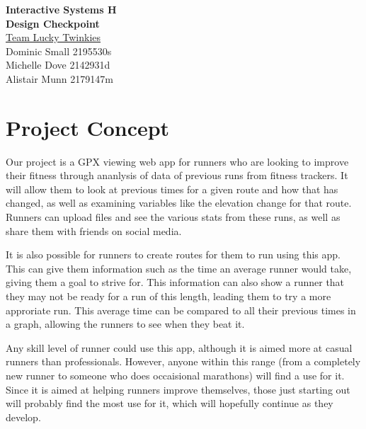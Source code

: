 \documentclass{article}
\begin{document}
\begin{center}
{\Huge \textbf{Interactive Systems H}}\\
{\huge \textbf{Design Checkpoint}}\\
\vspace{5mm}
\underline{Team Lucky Twinkies}\\
Dominic Small 2195530s\\
Michelle Dove 2142931d\\
Alistair Munn 2179147m\\
\end{center}

\section{Project Concept}
\label{sec:project}
Our project is a GPX viewing web app for runners who are looking to improve their fitness through ananlysis of data of previous runs from fitness trackers. It will allow them to look at previous times for a given route and how that has changed, as well as examining variables like the elevation change for that route. Runners can upload files and see the various stats from these runs, as well as share them with friends on social media.

It is also possible for runners to create routes for them to run using this app. This can give them information such as the time an average runner would take, giving them a goal to strive for. This information can also show a runner that they may not be ready for a run of this length, leading them to try a more approriate run. This average time can be compared to all their previous times in a graph, allowing the runners to see when they beat it.

Any skill level of runner could use this app, although it is aimed more at casual runners than professionals. However, anyone within this range (from a completely new runner to someone who does occaisional marathons) will find a use for it. Since it is aimed at helping runners improve themselves, those just starting out will probably find the most use for it, which will hopefully continue as they develop.
\end{document}
